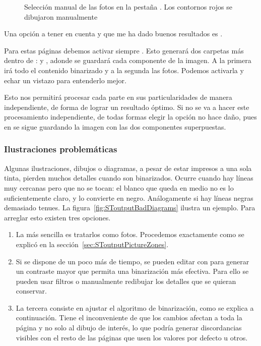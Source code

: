 \documentclass[%
	a5paper,
	10pt,
	twoside,
	openright,
	final,
]{memoir}
\begin{document}
{	\begin{figure}
		\caption[Selección manual en la pestaña \texttt{Picture Zones}]{Selección manual de las fotos en la pestaña . Los contornos rojos se dibujaron manualmente\label{fig:SToutputPicureZonesFree}}
	\end{figure}

	Una opción a tener en cuenta y que me ha dado buenos resultados es .

	Para estas páginas debemos activar siempre . Esto generará dos carpetas más dentro de :  y , adonde se guardará cada componente de la imagen. A la primera irá todo el contenido binarizado y a la segunda las fotos. Podemos activarla y echar un vistazo para entenderlo mejor.

	Esto nos permitirá procesar cada parte en sus particularidades de manera independiente, de forma de lograr un resultado óptimo. Si no se va a hacer este procesamiento independiente, de todas formas elegir la opción no hace daño, pues en  se sigue guardando la imagen con las dos componentes superpuestas.

	\subsubsection{Ilustraciones problemáticas} Algunas ilustraciones, dibujos o diagramas, a pesar de estar impresos a una sola tinta, pierden muchos detalles cuando son binarizados. Ocurre cuando hay líneas muy cercanas pero que no se tocan: el blanco que queda en medio no es lo suficientemente claro, y \scantailor lo convierte en negro. Análogamente si hay líneas negras demasiado tenues. La figura~\ref{fig:SToutputBadDiagrams} ilustra un ejemplo. Para arreglar esto existen tres opciones.

	\begin{enumerate}[noitemsep]
		\item La más sencilla es tratarlos como fotos. Procedemos exactamente como se explicó en la sección~\ref{sec:SToutputPictureZones}.
		\item Si se dispone de un poco más de tiempo, se pueden editar con \gimp para generar un contraste mayor que permita una binarización más efectiva. Para ello se pueden usar filtros o manualmente redibujar los detalles que se quieran conservar.
		\item La tercera consiste en ajustar el algoritmo de binarización, como se explica a continuación. Tiene el inconveniente de que los cambios afectan a toda la página y no solo al dibujo de interés, lo que podría generar discordancias visibles con el resto de las páginas que usen los valores por defecto u otros.
	\end{enumerate}

}
\end{document}
